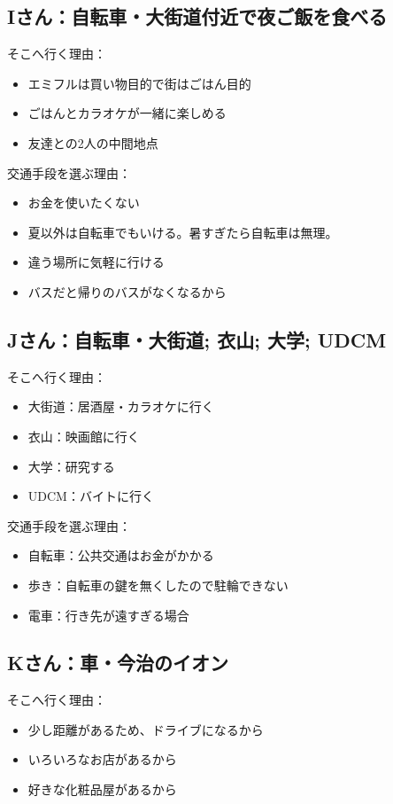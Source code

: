 \documentclass[a4paper,12pt, uplatex]{jsbook}
\begin{document}
\subsection{Iさん：自転車・大街道付近で夜ご飯を食べる}
そこへ行く理由：
\begin{itemize}
  \item エミフルは買い物目的で街はごはん目的
  \item ごはんとカラオケが一緒に楽しめる
  \item 友達との2人の中間地点
\end{itemize}

交通手段を選ぶ理由：
\begin{itemize}
  \item お金を使いたくない
  \item 夏以外は自転車でもいける。暑すぎたら自転車は無理。
  \item 違う場所に気軽に行ける
  \item バスだと帰りのバスがなくなるから
\end{itemize}


\subsection{Jさん：自転車・大街道; 衣山; 大学; UDCM}
そこへ行く理由：
\begin{itemize}
  \item 大街道：居酒屋・カラオケに行く
  \item 衣山：映画館に行く
  \item 大学：研究する
  \item UDCM：バイトに行く
\end{itemize}

交通手段を選ぶ理由：
\begin{itemize}
  \item 自転車：公共交通はお金がかかる
  \item 歩き：自転車の鍵を無くしたので駐輪できない
  \item 電車：行き先が遠すぎる場合
\end{itemize}


\subsection{Kさん：車・今治のイオン}
そこへ行く理由：
\begin{itemize}
  \item 少し距離があるため、ドライブになるから
  \item いろいろなお店があるから
  \item 好きな化粧品屋があるから
\end{itemize}
\end{document}
